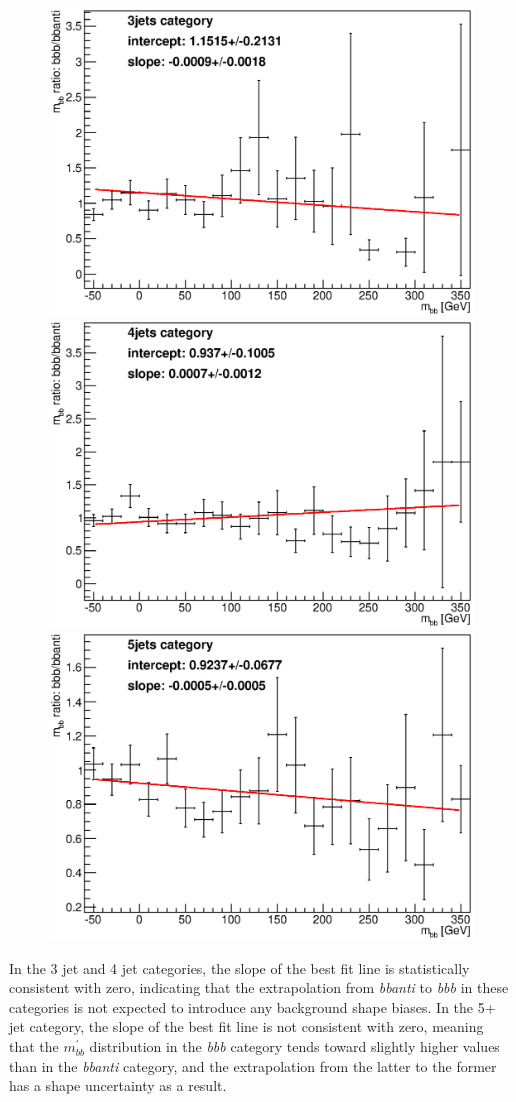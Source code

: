 \begin{figure}
    \center
  \includegraphics[width=0.5\linewidth]{Systematics/shape_check_mbb_bbb_3jets_rotated.eps}
  \includegraphics[width=0.5\linewidth]{Systematics/shape_check_mbb_bbb_4jets_rotated.eps}
  \includegraphics[width=0.5\linewidth]{Systematics/shape_check_mbb_bbb_5jets_rotated.eps}
  \caption{\label{fig:shape_checks_bg}}    
\end{figure}                                                                                                                        

In the 3 jet and 4 jet categories, the slope of the best fit line is statistically consistent
with zero, indicating that the extrapolation from \textit{bbanti} to \textit{bbb} in these
categories is not expected to introduce any background shape biases.  In the 5+ jet category,
the slope of the best fit line is not consistent with zero, meaning that the $m^{'}_{bb}$
distribution in the \textit{bbb} category tends toward slightly higher values than in the
\textit{bbanti} category, and the extrapolation from the latter to the former has a
shape uncertainty as a result.  

